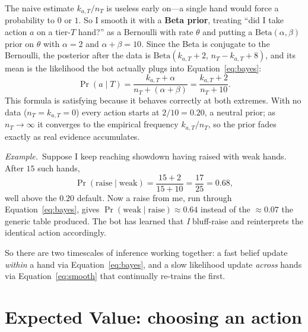 \documentclass[11pt]{article}
\newcommand{\example}[1]{\smallskip\noindent\textit{Example.}\ #1\smallskip}
\begin{document}
The naive estimate $k_{a,T}/n_T$ is useless early on---a single hand would force a
probability to $0$ or $1$. So I smooth it with a \textbf{Beta prior}, treating
``did I take action $a$ on a tier-$T$ hand?'' as a Bernoulli with rate $\theta$
and putting a $\mathrm{Beta}(\alpha,\beta)$ prior on $\theta$ with $\alpha=2$ and
$\alpha+\beta=10$. Since the Beta is conjugate to the Bernoulli, the posterior
after the data is $\mathrm{Beta}(k_{a,T}+2,\,n_T-k_{a,T}+8)$, and its mean is the
likelihood the bot actually plugs into Equation~\eqref{eq:bayes}:
\begin{equation}
\Pr(a\mid T)=\frac{k_{a,T}+\alpha}{n_T+(\alpha+\beta)}
=\frac{k_{a,T}+2}{n_T+10}.
\label{eq:smooth}
\end{equation}
This formula is satisfying because it behaves correctly at both extremes. With no
data ($n_T=k_{a,T}=0$) every action starts at $2/10=0.20$, a neutral prior; as
$n_T\to\infty$ it converges to the empirical frequency $k_{a,T}/n_T$, so the prior
fades exactly as real evidence accumulates.

\example{Suppose I keep reaching showdown having raised with weak hands. After
$15$ such hands,
\[
\Pr(\text{raise}\mid\text{weak})=\frac{15+2}{15+10}=\frac{17}{25}=0.68,
\]
well above the $0.20$ default. Now a raise from me, run through
Equation~\eqref{eq:bayes}, gives $\Pr(\text{weak}\mid\text{raise})\approx0.64$
instead of the $\approx0.07$ the generic table produced. The bot has learned that
\emph{I} bluff-raise and reinterprets the identical action accordingly.}

So there are two timescales of inference working together: a fast belief update
\emph{within} a hand via Equation~\eqref{eq:bayes}, and a slow likelihood update
\emph{across} hands via Equation~\eqref{eq:smooth} that continually re-trains the
first.

\section{Expected Value: choosing an action}
\end{document}
